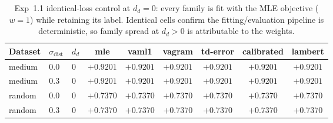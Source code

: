 \begin{table}[htbp]
\centering
\caption{Exp~1.1 identical-loss control at $d_d = 0$: every family is fit with the MLE objective ($w = 1$) while retaining its label. Identical cells confirm the fitting/evaluation pipeline is deterministic, so family spread at $d_d > 0$ is attributable to the weights.}
\label{tab:h11control}
\begin{tabular}{lllcccccc}
\toprule
Dataset & $\sigma_{\text{dist}}$ & $d_d$ & mle & vaml1 & vagram & td-error & calibrated & lambert \\
\midrule
medium & 0.0 & 0 & $+0.9201$ & $+0.9201$ & $+0.9201$ & $+0.9201$ & $+0.9201$ & $+0.9201$ \\
medium & 0.3 & 0 & $+0.9201$ & $+0.9201$ & $+0.9201$ & $+0.9201$ & $+0.9201$ & $+0.9201$ \\
random & 0.0 & 0 & $+0.7370$ & $+0.7370$ & $+0.7370$ & $+0.7370$ & $+0.7370$ & $+0.7370$ \\
random & 0.3 & 0 & $+0.7370$ & $+0.7370$ & $+0.7370$ & $+0.7370$ & $+0.7370$ & $+0.7370$ \\
\bottomrule
\end{tabular}
\end{table}
